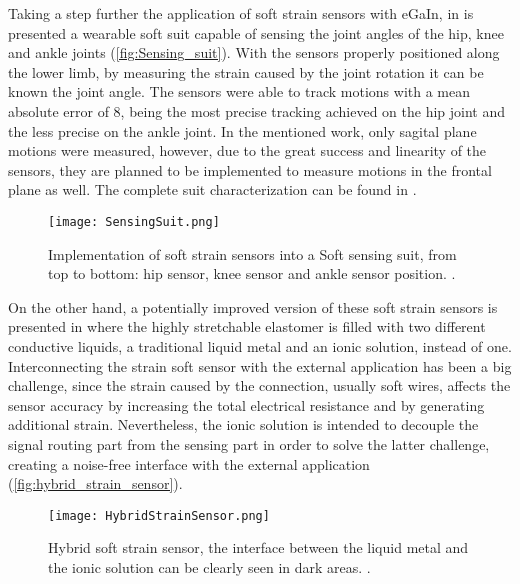 Taking a step further the application of soft strain sensors with eGaIn, in \cite{mengucc2013soft} is presented a wearable soft suit capable of sensing the joint angles of the hip, knee and ankle joints (\autoref{fig:Sensing_suit}). With the sensors properly positioned along the lower limb, by measuring the strain caused by the joint rotation it can be known the joint angle. The sensors were able to track motions with a mean absolute error of 8\textdegree{}, being the most precise tracking achieved on the hip joint and the less precise on the ankle joint. In the mentioned work, only sagital plane motions were measured, however, due to the great success and linearity of the sensors, they are planned to be implemented to measure motions in the frontal plane as well. The complete suit characterization can be found in \cite{mengucc2014wearable}.

\begin{figure}[hbtp!]
    \centering
    \texttt{[image: SensingSuit.png]}
    \caption{Implementation of soft strain sensors into a Soft sensing suit, from top to bottom: hip sensor, knee sensor and ankle sensor position. \cite{mengucc2013soft}. }
    \label{fig:Sensing_suit}
\end{figure}

On the other hand, a potentially improved version of these soft strain sensors is presented in \cite{Chossat2013} where the highly stretchable elastomer is filled with two different conductive liquids, a traditional liquid metal and an ionic solution, instead of one. Interconnecting the strain soft sensor with the external application has been a big challenge, since the strain caused by the connection, usually soft wires, affects the sensor accuracy by increasing the total electrical resistance and by generating additional strain. Nevertheless, the ionic solution is intended to decouple the signal routing part from the sensing part in order to solve the latter challenge, creating a noise-free interface with the external application (\autoref{fig:hybrid_strain_sensor}).

\begin{figure}[hbtp!]
    \centering
    \texttt{[image: HybridStrainSensor.png]}
    \caption{Hybrid soft strain sensor, the interface between the liquid metal and the ionic solution can be clearly seen in dark areas. \cite{Chossat2013}. }
    \label{fig:hybrid_strain_sensor}
\end{figure}

